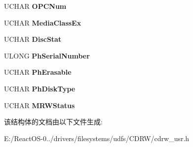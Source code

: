 \begin{DoxyCompactItemize}
U\+C\+H\+AR {\bfseries O\+P\+C\+Num}
\item 
\mbox{\label{struct___g_e_t___d_i_s_k___l_a_y_o_u_t___u_s_e_r___o_u_t_a2479a3b2f51eeb6767723df679a83511}} 
U\+C\+H\+AR {\bfseries Media\+Class\+Ex}
\item 
\mbox{\label{struct___g_e_t___d_i_s_k___l_a_y_o_u_t___u_s_e_r___o_u_t_af45902708b7640f45354d4b8b990e856}} 
U\+C\+H\+AR {\bfseries Disc\+Stat}
\item 
\mbox{\label{struct___g_e_t___d_i_s_k___l_a_y_o_u_t___u_s_e_r___o_u_t_a67868ddc448da1f1b9afee44b72ec88f}} 
U\+L\+O\+NG {\bfseries Ph\+Serial\+Number}
\item 
\mbox{\label{struct___g_e_t___d_i_s_k___l_a_y_o_u_t___u_s_e_r___o_u_t_a46d9ba0f30a37535b496a58516696faa}} 
U\+C\+H\+AR {\bfseries Ph\+Erasable}
\item 
\mbox{\label{struct___g_e_t___d_i_s_k___l_a_y_o_u_t___u_s_e_r___o_u_t_a4d89b0ca1ab4f99b91bebcf82b695d5a}} 
U\+C\+H\+AR {\bfseries Ph\+Disk\+Type}
\item 
\mbox{\label{struct___g_e_t___d_i_s_k___l_a_y_o_u_t___u_s_e_r___o_u_t_affa22a3592427bb3c74b1cc17607fc49}} 
U\+C\+H\+AR {\bfseries M\+R\+W\+Status}
\end{DoxyCompactItemize}


该结构体的文档由以下文件生成\+:\begin{DoxyCompactItemize}
\item 
E\+:/\+React\+O\+S-\/0../drivers/filesystems/udfs/\+C\+D\+R\+W/cdrw\+\_\+usr.\+h\end{DoxyCompactItemize}
